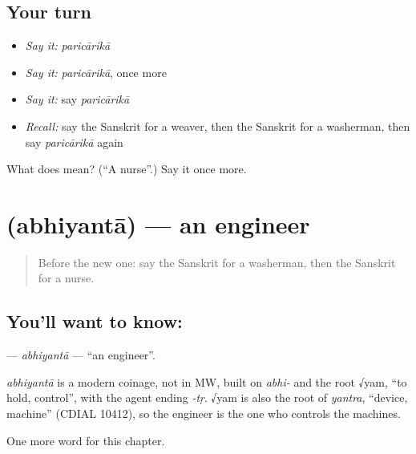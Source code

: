 \subsection*{Your turn}
\begin{itemize}
\raggedright
  \item \emph{Say it:} \emph{paricārikā}
  \item \emph{Say it:} \emph{paricārikā}, once more
  \item \emph{Say it:} say \emph{paricārikā}
  \item \emph{Recall:} say the Sanskrit for a weaver, then the Sanskrit for a washerman, then say \emph{paricārikā} again
\end{itemize}

\begin{tcolorbox}[breakable,colback=teal!4,colframe=teal!35!black,title={Before you move on}]
What does  mean? (\textquotedblleft{}A nurse\textquotedblright{}.) Say it once more.
\end{tcolorbox}
\section[\texorpdfstring{\sk{अभियन्ता} (abhiyantā)}{अभियन्ता (abhiyantā)}]{ (abhiyantā) — an engineer}

\label{lesson:SA-C238-abhiyanta}



\begin{quote}
Before the new one: say the Sanskrit for a washerman, then the Sanskrit for a nurse.
\end{quote}

\subsection*{You'll want to know: }
\textbf{} — \emph{abhiyantā} — \textquotedblleft{}an engineer\textquotedblright{}.

\begin{cousinweb}
\emph{abhiyantā} is a modern coinage, not in MW, built on \emph{abhi-} and the root √yam, \textquotedblleft{}to hold, control\textquotedblright{}, with the agent ending \emph{-tṛ}. √yam is also the root of \emph{yantra}, \textquotedblleft{}device, machine\textquotedblright{} (CDIAL 10412), so the engineer is the one who controls the machines.
\end{cousinweb}

\begin{grammarlens}[title={What you've built}]
One more word for this chapter.
\end{grammarlens}

